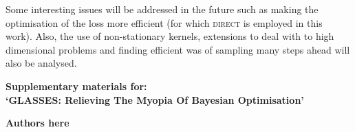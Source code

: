 \documentclass[twoside]{article}
\newcommand{\acr}[1]{\textsc{#1}\xspace}
\newcommand{\direct}{\acr{direct}}
\begin{document}
Some interesting issues will be addressed in the future such as making the optimisation of the loss more efficient (for which \direct is employed in this work). Also, the use of non-stationary kernels, extensions to deal with to high dimensional problems and finding efficient was of sampling many steps ahead will also be analysed.
  
\newpage
\newpage
\newpage



\newpage
\clearpage
\setcounter{section}{0}
\setcounter{equation}{0}
\renewcommand{\thesection}{S\arabic{section}}
\renewcommand{\theequation}{S.\arabic{equation}}
\onecolumn
\begin{center}
{\Large  \textbf{Supplementary materials for:\\
`GLASSES: Relieving The Myopia Of Bayesian Optimisation'}}
\end{center}
\begin{center}
\textbf{Authors here}
\end{center}

\vspace{1cm}
\end{document}
